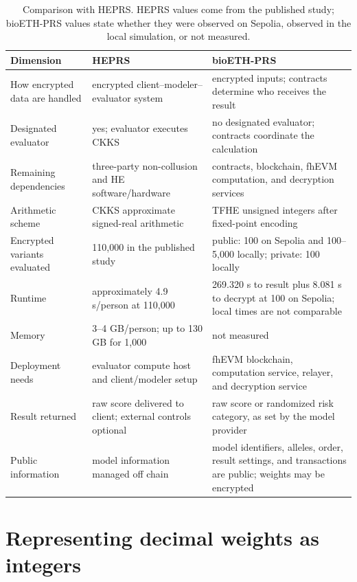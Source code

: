 \documentclass[10pt]{article}
\begin{document}
\begin{table}[t]
\centering
\caption{Comparison with HEPRS. HEPRS values come from the published study;
bioETH-PRS values state whether they were observed on Sepolia, observed in the local
simulation, or not measured.}
\label{tab:comparison}
\footnotesize
\setlength{\tabcolsep}{4pt}
\begin{tabularx}{\textwidth}{@{}p{3.1cm}XX@{}}
\toprule
\textbf{Dimension} & \textbf{HEPRS} \citep{knight2026heprs} & \textbf{bioETH-PRS} \\
\midrule
How encrypted data are handled & encrypted client--modeler--evaluator system & encrypted inputs; contracts determine who receives the result \\
Designated evaluator & yes; evaluator executes CKKS & no designated evaluator; contracts coordinate the calculation \\
Remaining dependencies & three-party non-collusion and HE software/hardware & contracts, blockchain, fhEVM computation, and decryption services \\
Arithmetic scheme & CKKS approximate signed-real arithmetic & TFHE unsigned integers after fixed-point encoding \\
Encrypted variants evaluated & 110,000 in the published study & public: 100 on Sepolia and 100--5,000 locally; private: 100 locally \\
Runtime & approximately 4.9 s/person at 110,000 & 269.320 s to result plus 8.081 s to decrypt at 100 on Sepolia; local times are not comparable \\
Memory & 3--4 GB/person; up to 130 GB for 1,000 & not measured \\
Deployment needs & evaluator compute host and client/modeler setup & fhEVM blockchain, computation service, relayer, and decryption service \\
Result returned & raw score delivered to client; external controls optional & raw score or randomized risk category, as set by the model provider \\
Public information & model information managed off chain & model identifiers, alleles, order, result settings, and transactions are public; weights may be encrypted \\
\bottomrule
\end{tabularx}
\end{table}

\section{Representing decimal weights as integers}
\label{sec:quantization}
\end{document}
